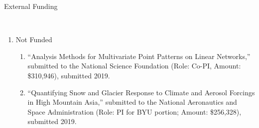 \documentclass[12pt]{article}
\newcommand{\head}[1]{ %
    \bigskip %
    \begin{large}\begin{bf}{#1}\end{bf}\end{large} %

    \ \\ [-1.3cm] %

    \hrulefill}
\begin{document}
\head{External Funding}
\begin{enumerate}[label=$\bullet$]

\item Not Funded
\begin{enumerate}[label=$\cdot$]
\item ``Analysis Methods for Multivariate Point Patterns on Linear Networks,'' submitted to the National Science Foundation (Role: Co-PI, Amount: \$310,946), submitted 2019.
\item ``Quantifying Snow and Glacier Response to Climate and Aerosol Forcings in High Mountain Asia,'' submitted to the National Aeronautics and Space Administration (Role: PI for BYU portion; Amount: \$256,328), submitted 2019.
\end{enumerate}
\end{enumerate}
\end{document}
